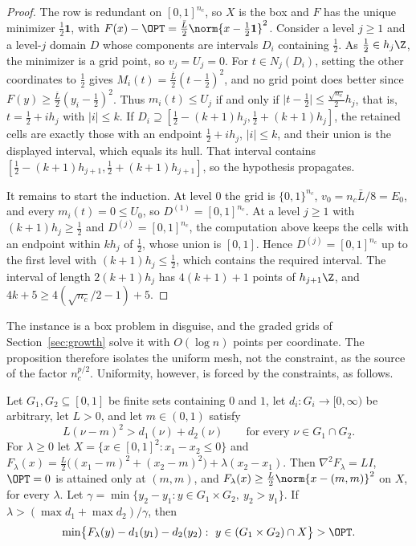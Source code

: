 \begin{proof}
The row is redundant on $[0,1]^{n_c}$, so $X$ is the box and $F$ has the
unique minimizer $\frac12\mathbf 1$, with $F(x)-\OPT=\frac{\bar L}2\norm{x-\frac12\mathbf 1}^2$.
Consider a level $j\ge1$ and a level-$j$ domain $D$ whose components are
intervals $D_i$ containing $\frac12$. As $\frac12\in h_j\Z$, the minimizer is a
grid point, so $v_j=U_j=0$. For $t\in N_j(D_i)$, setting the other
coordinates to $\frac12$ gives $M_i(t)=\frac{\bar L}2(t-\frac12)^2$, and no
grid point does better since $F(y)\ge\frac{\bar L}2(y_i-\frac12)^2$. Thus
$m_i(t)\le U_j$ if and only if $\lvert t-\frac12\rvert\le\frac{\sqrt{n_c}}2h_j$, that
is, $t=\frac12+ih_j$ with $\lvert i\rvert\le k$. If
$D_i\supseteq[\frac12-(k+1)h_j,\frac12+(k+1)h_j]$, the retained cells are exactly
those with an endpoint $\frac12+ih_j$, $\lvert i\rvert\le k$, and their union is the
displayed interval, which equals its hull. That interval contains
$[\frac12-(k+1)h_{j+1},\frac12+(k+1)h_{j+1}]$, so the hypothesis propagates.

It remains to start the induction. At level $0$ the grid is $\{0,1\}^{n_c}$,
$v_0=n_c\bar L/8=E_0$, and every $m_i(t)=0\le U_0$, so $D^{(1)}=[0,1]^{n_c}$. At
a level $j\ge1$ with $(k+1)h_j\ge\frac12$ and $D^{(j)}=[0,1]^{n_c}$, the computation
above keeps the cells with an endpoint within $kh_j$ of $\frac12$, whose union
is $[0,1]$. Hence $D^{(j)}=[0,1]^{n_c}$ up to the first level with
$(k+1)h_j\le\frac12$, which contains the required interval. The interval of
length $2(k+1)h_j$ has $4(k+1)+1$ points of $h_{j+1}\Z$, and
$4k+5\ge4(\sqrt{n_c}/2-1)+5$.
\end{proof}

The instance is a box problem in disguise, and the graded grids of
Section~\ref{sec:growth} solve it with $O(\log n)$ points per coordinate. The
proposition therefore isolates the uniform mesh, not the constraint, as the
source of the factor $n_c^{p/2}$. Uniformity, however, is forced by the
constraints, as follows.

\begin{proposition}\label{prop:tu-misaligned}
Let $G_1,G_2\subseteq[0,1]$ be finite sets containing $0$ and $1$, let
$d_i:G_i\to[0,\infty)$ be arbitrary, let $L>0$, and let $m\in(0,1)$ satisfy
\begin{equation}\label{eq:tu-gap}
L(\nu-m)^2>d_1(\nu)+d_2(\nu)\qquad\text{for every }\nu\in G_1\cap G_2 .
\end{equation}
For $\lambda\ge0$ let $X=\{x\in[0,1]^2:x_1-x_2\le0\}$ and
$F_\lambda(x)=\frac L2\bigl((x_1-m)^2+(x_2-m)^2\bigr)+\lambda(x_2-x_1)$. Then
$\nabla^2F_\lambda=LI$, $\OPT=0$ is attained only at $(m,m)$, and
$F_\lambda(x)\ge\frac L2\norm{x-(m,m)}^2$ on $X$, for every $\lambda$. Let
$\gamma=\min\{y_2-y_1:y\in G_1\times G_2,\ y_2>y_1\}$. If
$\lambda>(\max d_1+\max d_2)/\gamma$, then
\[
\min\bigl\{F_\lambda(y)-d_1(y_1)-d_2(y_2):\ y\in(G_1\times G_2)\cap X\bigr\}>\OPT .
\]
\end{proposition}

